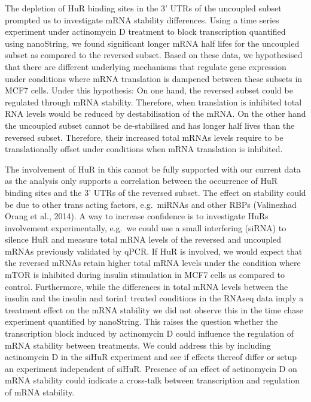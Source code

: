 \documentclass[
  12pt,
  openany]{book}
\begin{document}
The depletion of HuR binding sites in the 3' UTRs of the uncoupled subset prompted us to investigate mRNA stability differences. Using a time series experiment under actinomycin D treatment to block transcription quantified using nanoString, we found significant longer mRNA half lifes for the uncoupled subset as compared to the reversed subset. Based on these data, we hypothesised that there are different underlying mechanisms that regulate gene expression under conditions where mRNA translation is dampened between these subsets in MCF7 cells. Under this hypothesis: On one hand, the reversed subset could be regulated through mRNA stability. Therefore, when translation is inhibited total RNA levels would be reduced by destabilisation of the mRNA. On the other hand the uncoupled subset cannot be de-stabilised and has longer half lives than the reversed subset. Therefore, their increased total mRNAs levels require to be translationally offset under conditions when mRNA translation is inhibited.

The involvement of HuR in this cannot be fully supported with our current data as the analysis only supports a correlation between the occurrence of HuR binding sites and the 3' UTRs of the reversed subset. The effect on stability could be due to other trans acting factors, e.g.~miRNAs and other RBPs (Valinezhad Orang et al., 2014). A way to increase confidence is to investigate HuRs involvement experimentally, e.g.~we could use a small interfering (siRNA) to silence HuR and measure total mRNA levels of the reversed and uncoupled mRNAs previously validated by qPCR. If HuR is involved, we would expect that the reversed mRNAs retain higher total mRNA levels under the condition where mTOR is inhibited during insulin stimulation in MCF7 cells as compared to control. Furthermore, while the differences in total mRNA levels between the insulin and the insulin and torin1 treated conditions in the RNAseq data imply a treatment effect on the mRNA stability we did not observe this in the time chase experiment quantified by nanoString. This raises the question whether the transcription block induced by actinomycin D could influence the regulation of mRNA stability between treatments. We could address this by including actinomycin D in the siHuR experiment and see if effects thereof differ or setup an experiment independent of siHuR. Presence of an effect of actinomycin D on mRNA stability could indicate a cross-talk between transcription and regulation of mRNA stability.
\end{document}
